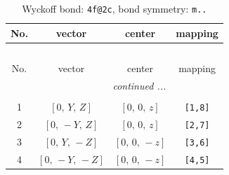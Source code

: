 \documentclass[fleqn,8pt]{jsarticle}
\begin{document}
\renewcommand{\arraystretch}{1.2}
\begin{longtable}{cccc}
\caption{Wyckoff bond: {\tt 4f@2c}, bond symmetry: {\tt m..}}
 \\
 \hline \hline
No. & vector & center & mapping \\ \hline \endfirsthead

\multicolumn{3}{l}{\tablename\ \thetable{}} \\
 \hline \hline
No. & vector & center & mapping \\ \hline \endhead

 \hline \hline
\multicolumn{3}{r}{\footnotesize\it continued ...} \\ \endfoot

 \hline \hline
\multicolumn{3}{r}{} \\ \endlastfoot

1 & $\left[ 0,\, Y,\, Z \right]$ & $\left[ 0,\, 0,\, z \right]$ & {\tt [1,8]} \\ \hline
2 & $\left[ 0,\, - Y,\, Z \right]$ & $\left[ 0,\, 0,\, z \right]$ & {\tt [2,7]} \\ \hline
3 & $\left[ 0,\, Y,\, - Z \right]$ & $\left[ 0,\, 0,\, - z \right]$ & {\tt [3,6]} \\ \hline
4 & $\left[ 0,\, - Y,\, - Z \right]$ & $\left[ 0,\, 0,\, - z \right]$ & {\tt [4,5]} \\
\end{longtable}
\renewcommand{\arraystretch}{1.2}
\end{document}
